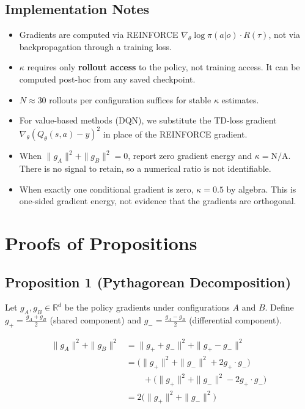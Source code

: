 \documentclass[letterpaper]{article}
\begin{document}
\subsection{Implementation Notes}

\begin{itemize}
\item Gradients are computed via REINFORCE $\nabla_\theta \log \pi(a|o) \cdot R(\tau)$,
  not via backpropagation through a training loss.
\item $\kappa$ requires only \textbf{rollout access} to the policy, not training access.
  It can be computed post-hoc from any saved checkpoint.
\item $N \approx 30$ rollouts per configuration suffices for stable $\kappa$ estimates.
\item For value-based methods (DQN), we substitute the TD-loss gradient
  $\nabla_\theta (Q_\theta(s,a) - y)^2$ in place of the REINFORCE gradient.
\item When $\|g_A\|^2 + \|g_B\|^2 = 0$, report zero gradient energy and
  $\kappa=\mathrm{N/A}$. There is no signal to retain, so a numerical ratio is
  not identifiable.
\item When exactly one conditional gradient is zero, $\kappa=0.5$ by algebra.
  This is one-sided gradient energy, not evidence that the gradients are
  orthogonal.
\end{itemize}

\section{Proofs of Propositions}

\subsection{Proposition 1 (Pythagorean Decomposition)}

Let $g_A, g_B \in \mathbb{R}^d$ be the policy gradients under configurations $A$ and $B$.
Define $g_+ = \frac{g_A + g_B}{2}$ (shared component) and $g_- = \frac{g_A - g_B}{2}$
(differential component).

\begin{align}
\|g_A\|^2 + \|g_B\|^2
&= \|g_+ + g_-\|^2 + \|g_+ - g_-\|^2 \\
&= \bigl(\|g_+\|^2 + \|g_-\|^2 + 2 g_+ \!\cdot\! g_-\bigr) \\
&\qquad + \bigl(\|g_+\|^2 + \|g_-\|^2 - 2 g_+ \!\cdot\! g_-\bigr) \\
&= 2\bigl(\|g_+\|^2 + \|g_-\|^2\bigr)
\end{align}
\end{document}
